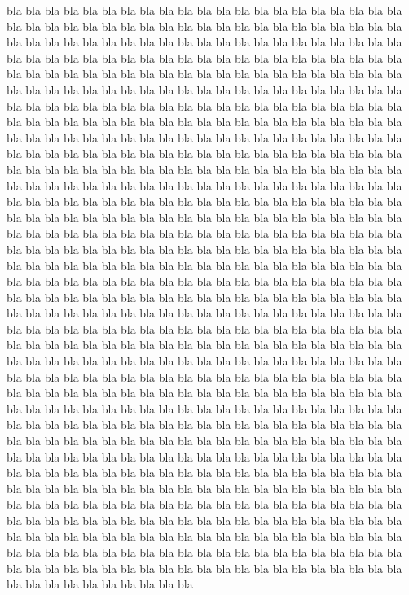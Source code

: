 \documentclass[12pt]{book}%
\theoremstyle{newstyle}%
\begin{document}
bla bla bla bla bla bla bla bla bla bla bla bla bla bla bla bla bla bla bla bla bla bla bla bla bla bla bla bla bla bla bla bla bla bla bla bla bla bla bla bla bla bla bla bla bla bla bla bla bla bla bla bla bla bla bla bla bla bla bla bla bla bla bla bla bla bla bla bla bla bla bla bla bla bla bla bla bla bla bla bla bla bla bla bla bla bla bla bla bla bla bla bla bla bla bla bla bla bla bla bla bla bla bla bla bla bla bla bla bla bla bla bla bla bla bla bla bla bla bla bla bla bla bla bla bla bla bla bla bla bla bla bla bla bla bla bla bla bla bla bla bla bla bla bla bla bla bla bla bla bla bla bla bla bla bla bla bla bla bla bla bla bla bla bla bla bla bla bla bla bla bla bla bla bla bla bla bla bla bla bla bla bla bla bla bla bla bla bla bla bla bla bla bla bla bla bla bla bla bla bla bla bla bla bla bla bla bla bla bla bla bla bla bla bla bla bla bla bla bla bla bla bla bla bla bla bla bla bla bla bla bla bla bla bla bla bla bla bla bla bla bla bla bla bla bla bla bla bla bla bla bla bla bla bla bla bla bla bla bla bla bla bla bla bla bla bla bla bla bla bla bla bla bla bla bla bla bla bla bla bla bla bla bla bla bla bla bla bla bla bla bla bla bla bla bla bla bla bla bla bla bla bla bla bla bla bla bla bla bla bla bla bla bla bla bla bla bla bla bla bla bla bla bla bla bla bla bla bla bla bla bla bla bla bla bla bla bla bla bla bla bla bla bla bla bla bla bla bla bla bla bla bla bla bla bla bla bla bla bla bla bla bla bla bla bla bla bla bla bla bla bla bla bla bla bla bla bla bla bla bla bla bla bla bla bla bla bla bla bla bla bla bla bla bla bla bla bla bla bla bla bla bla bla bla bla bla bla bla bla bla bla bla bla bla bla bla bla bla bla bla bla bla bla bla bla bla bla bla bla bla bla bla bla bla bla bla bla bla bla bla bla bla bla bla bla bla bla bla bla bla bla bla bla bla bla bla bla bla bla bla bla bla bla bla bla bla bla bla bla bla bla bla bla bla bla bla bla bla bla bla bla bla bla bla bla bla bla bla bla bla bla bla bla bla bla bla bla bla bla bla bla bla bla bla bla bla bla bla bla bla bla bla bla bla bla bla bla bla bla bla bla bla bla bla bla bla bla bla bla bla bla bla bla bla bla bla bla bla bla bla bla bla bla bla bla bla bla bla bla bla bla bla bla bla bla bla bla bla bla bla bla bla bla bla bla bla bla bla bla bla bla bla bla bla bla bla bla bla bla bla bla bla bla bla bla bla bla bla bla bla bla bla bla bla bla bla bla bla bla bla bla bla bla bla bla bla bla bla bla bla bla bla bla bla bla bla bla bla bla bla bla bla bla bla bla bla bla bla bla bla bla bla bla bla bla bla bla bla bla bla bla bla bla bla bla bla bla bla bla bla bla bla bla bla bla bla bla bla bla bla bla bla bla bla bla bla bla bla bla bla bla bla bla bla bla bla bla bla bla bla bla bla bla bla bla bla bla bla bla bla bla bla bla bla bla bla bla bla bla bla bla bla bla bla bla bla bla bla bla bla bla bla bla bla bla bla bla bla bla bla bla bla bla bla bla bla bla bla bla bla bla bla bla bla bla bla bla bla bla bla bla bla bla bla bla bla bla bla bla bla bla bla bla bla bla bla bla bla bla bla bla bla bla bla bla bla 
\end{document}
